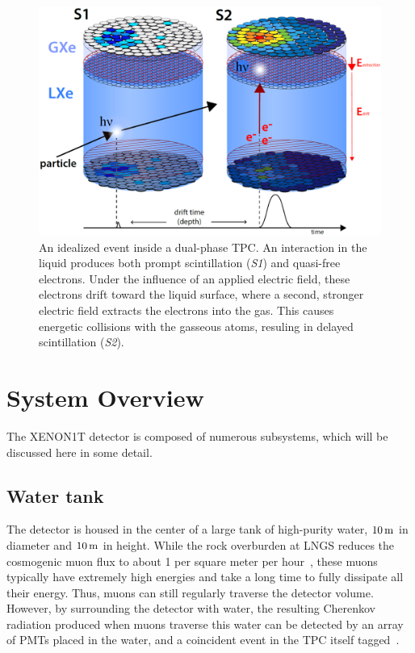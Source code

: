 \begin{figure}[htb]
	\includegraphics[width=\textwidth]{figures/xe1t/tpc_xe1t_workingprinciple_v2}
	\caption{An idealized event inside a dual-phase TPC. An interaction in the liquid produces both prompt scintillation (\textit{S1}) and quasi-free electrons. Under the influence of an applied electric field, these electrons drift toward the liquid surface, where a second, stronger electric field extracts the electrons into the gas. This causes energetic collisions with the gasseous atoms, resuling in delayed scintillation (\textit{S2}).}\label{fig:idealized_event}
\end{figure}

\section{System Overview}

The XENON1T detector is composed of numerous subsystems, which will be discussed here in some detail.

\subsection{Water tank}

The detector is housed in the center of a large tank of high-purity water, $10\, \mathrm{m}$ in diameter and $10\, \mathrm{m}$ in height. While the rock overburden at LNGS reduces the cosmogenic muon flux to about 1 per square meter per hour~\cite{Bellini:2012te}, these muons typically have extremely high energies and take a long time to fully dissipate all their energy. Thus, muons can still regularly traverse the detector volume. However, by surrounding the detector with water, the resulting Cherenkov radiation produced when muons traverse this water can be detected by an array of PMTs placed in the water, and a coincident event in the TPC itself tagged~\cite{Aprile:2014zvw}.

